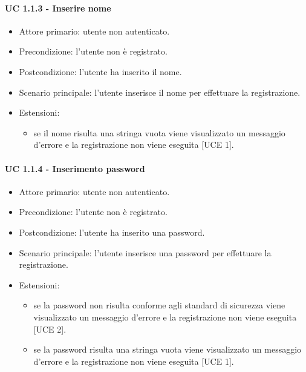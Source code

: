         \paragraph{UC 1.1.3 - Inserire nome}
            \begin{itemize}
                \item Attore primario: utente non autenticato.
                \item Precondizione: l'utente non è registrato.
                \item Postcondizione: l'utente ha inserito il nome.
                \item Scenario principale: l'utente inserisce il nome per effettuare la registrazione.
                \item Estensioni:
                    \begin{itemize}
                        \item se il nome risulta una stringa vuota viene visualizzato un messaggio d'errore e la registrazione non viene eseguita [UCE 1].
                    \end{itemize}
            \end{itemize}
        \paragraph{UC 1.1.4 - Inserimento password}
            \begin{itemize}
                \item Attore primario: utente non autenticato.
                \item Precondizione: l'utente non è registrato.
                \item Postcondizione: l'utente ha inserito una password.
                \item Scenario principale: l'utente inserisce una password per effettuare la registrazione.
                \item Estensioni:
                    \begin{itemize}
                        \item se la password non risulta conforme agli standard di sicurezza viene visualizzato un messaggio d'errore e la registrazione non viene eseguita [UCE 2].
                        \item se la password risulta una stringa vuota viene visualizzato un messaggio d'errore e la registrazione non viene eseguita [UCE 1].
                    \end{itemize}
            \end{itemize}
